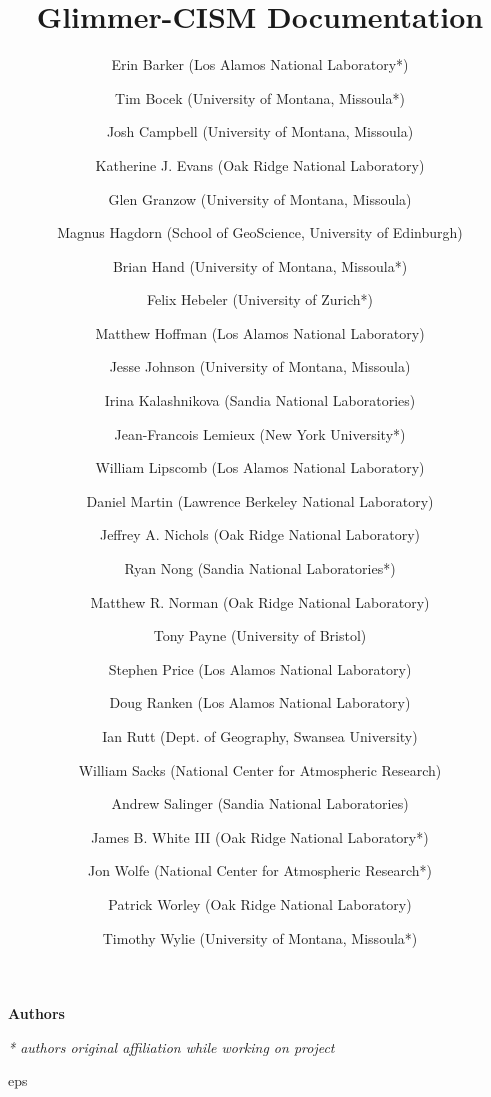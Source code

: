 

\frontmatter

\title{Glimmer-CISM {\glimmerver} Documentation}
\maketitle

\begin{center}
\textbf{\Large Authors}
\end{center}

\author{Erin Barker (Los Alamos National Laboratory*)}
\author{Tim Bocek  (University of Montana, Missoula*)}
\author{Josh Campbell  (University of Montana, Missoula)}
\author{Katherine J. Evans (Oak Ridge National Laboratory)}
\author{Glen Granzow (University of Montana, Missoula)}
\author{Magnus Hagdorn (School of GeoScience, University of Edinburgh)}
\author{Brian Hand (University of Montana, Missoula*)}
\author{Felix Hebeler (University of Zurich*)}
\author{Matthew Hoffman (Los Alamos National Laboratory)}
\author{Jesse Johnson (University of Montana, Missoula)}
\author{Irina Kalashnikova (Sandia National Laboratories)}
\author{Jean-Francois Lemieux (New York University*)}
\author{William Lipscomb (Los Alamos National Laboratory)}
\author{Daniel Martin (Lawrence Berkeley National Laboratory)}
\author{Jeffrey A. Nichols (Oak Ridge National Laboratory)}
\author{Ryan Nong (Sandia National Laboratories*)}
\author{Matthew R. Norman (Oak Ridge National Laboratory)}
\author{Tony Payne (University of Bristol)}
\author{Stephen Price (Los Alamos National Laboratory)}
\author{Doug Ranken (Los Alamos National Laboratory)}
\author{Ian Rutt (Dept. of Geography, Swansea University)}
\author{William Sacks (National Center for Atmospheric Research)}
\author{Andrew Salinger (Sandia National Laboratories)}
\author{James B. White III (Oak Ridge National Laboratory*)}
\author{Jon Wolfe (National Center for Atmospheric Research*)}
\author{Patrick Worley (Oak Ridge National Laboratory)}
\author{Timothy Wylie (University of Montana, Missoula*)}

\textit{* authors original affiliation while working on project}


\tableofcontents

{
         {eps} 
         {%
         } 

}
{}

